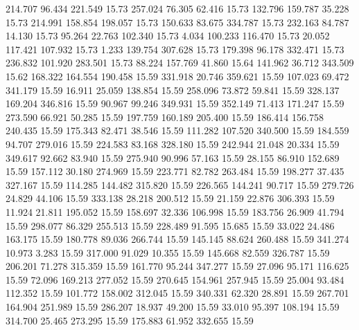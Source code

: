  214.707   96.434  221.549        15.73
 257.024   76.305   62.416        15.73
 132.796  159.787   35.228        15.73
 214.991  158.854  198.057        15.73
 150.633   83.675  334.787        15.73
 232.163   84.787   14.130        15.73
  95.264   22.763  102.340        15.73
   4.034  100.233  116.470        15.73
  20.052  117.421  107.932        15.73
   1.233  139.754  307.628        15.73
 179.398   96.178  332.471        15.73
 236.832  101.920  283.501        15.73
  88.224  157.769   41.860        15.64
 141.962   36.712  343.509        15.62
 168.322  164.554  190.458        15.59
 331.918   20.746  359.621        15.59
 107.023   69.472  341.179        15.59
  16.911   25.059  138.854        15.59
 258.096   73.872   59.841        15.59
 328.137  169.204  346.816        15.59
  90.967   99.246  349.931        15.59
 352.149   71.413  171.247        15.59
 273.590   66.921   50.285        15.59
 197.759  160.189  205.400        15.59
 186.414  156.758  240.435        15.59
 175.343   82.471   38.546        15.59
 111.282  107.520  340.500        15.59
 184.559   94.707  279.016        15.59
 224.583   83.168  328.180        15.59
 242.944   21.048   20.334        15.59
 349.617   92.662   83.940        15.59
 275.940   90.996   57.163        15.59
  28.155   86.910  152.689        15.59
 157.112   30.180  274.969        15.59
 223.771   82.782  263.484        15.59
 198.277   37.435  327.167        15.59
 114.285  144.482  315.820        15.59
 226.565  144.241   90.717        15.59
 279.726   24.829   44.106        15.59
 333.138   28.218  200.512        15.59
  21.159   22.876  306.393        15.59
  11.924   21.811  195.052        15.59
 158.697   32.336  106.998        15.59
 183.756   26.909   41.794        15.59
 298.077   86.329  255.513        15.59
 228.489   91.595   15.685        15.59
  33.022   24.486  163.175        15.59
 180.778   89.036  266.744        15.59
 145.145   88.624  260.488        15.59
 341.274   10.973    3.283        15.59
 317.000   91.029   10.355        15.59
 145.668   82.559  326.787        15.59
 206.201   71.278  315.359        15.59
 161.770   95.244  347.277        15.59
  27.096   95.171  116.625        15.59
  72.096  169.213  277.052        15.59
 270.645  154.961  257.945        15.59
  25.004   93.484  112.352        15.59
 101.772  158.002  312.045        15.59
 340.331   62.320   28.891        15.59
 267.701  164.904  251.989        15.59
 286.207   18.937   49.200        15.59
  33.010   95.397  108.194        15.59
 314.700   25.465  273.295        15.59
 175.883   61.952  332.655        15.59
